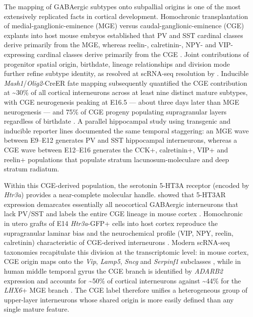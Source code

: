 \documentclass[11pt]{article}
\begin{document}
The mapping of GABAergic subtypes onto subpallial origins is one of the most extensively replicated facts in cortical development. Homochronic transplantation of medial-ganglionic-eminence (MGE) versus caudal-ganglionic-eminence (CGE) explants into host mouse embryos established that PV and SST cardinal classes derive primarily from the MGE, whereas reelin-, calretinin-, NPY- and VIP-expressing cardinal classes derive primarily from the CGE \citep{Bandler2017}. Joint contributions of progenitor spatial origin, birthdate, lineage relationships and division mode further refine subtype identity, as resolved at scRNA-seq resolution by \citet{Mi2018}. Inducible \textit{Mash1}/\textit{Olig2}-CreER fate mapping subsequently quantified the CGE contribution at {\textasciitilde}30\% of all cortical interneurons across at least nine distinct mature subtypes, with CGE neurogenesis peaking at E16.5 --- about three days later than MGE neurogenesis --- and 75\% of CGE progeny populating supragranular layers regardless of birthdate \citep{Miyoshi2010}. A parallel hippocampal study using transgenic and inducible reporter lines documented the same temporal staggering: an MGE wave between E9--E12 generates PV and SST hippocampal interneurons, whereas a CGE wave between E12--E16 generates the CCK+, calretinin+, VIP+ and reelin+ populations that populate stratum lacunosum-moleculare and deep stratum radiatum.

Within this CGE-derived population, the serotonin 5-HT3A receptor (encoded by \textit{Htr3a}) provides a near-complete molecular handle. \citet{Lee2010} showed that 5-HT3AR expression demarcates essentially all neocortical GABAergic interneurons that lack PV/SST and labels the entire CGE lineage in mouse cortex \citep{Lee2010}. Homochronic in utero grafts of E14 \textit{Htr3a}-GFP+ cells into host cortex reproduce the supragranular laminar bias and the neurochemical profile (VIP, NPY, reelin, calretinin) characteristic of CGE-derived interneurons \citep{Vucurovic2010}. Modern scRNA-seq taxonomies recapitulate this division at the transcriptomic level: in mouse cortex, CGE origin maps onto the \textit{Vip}, \textit{Lamp5}, \textit{Sncg} and \textit{Serpinf1} subclasses \citep{Tasic2018}, while in human middle temporal gyrus the CGE branch is identified by \textit{ADARB2} expression and accounts for {\textasciitilde}50\% of cortical interneurons against {\textasciitilde}44\% for the \textit{LHX6}+ MGE branch \citep{Hodge2019}. The CGE label therefore unifies a heterogeneous group of upper-layer interneurons whose shared origin is more easily defined than any single mature feature.
\end{document}
